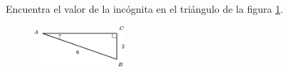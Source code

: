 Encuentra el valor de la incógnita en el triángulo de la figura \ref{fig:angle_functrig_01}.
\begin{figure}[H]
    \begin{center}
        \includegraphics[width=0.3\textwidth]{../images/angle_functrig_01.png}
    \end{center}
    \caption{}
    \label{fig:angle_functrig_01}
\end{figure}